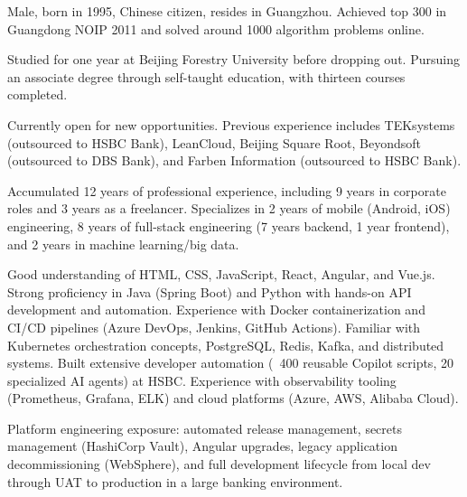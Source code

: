 

\begin{cventry}
    {} %
    {} %
    {} %
    {} %
    {
        \begin{cvitems}
            \item {Male, born in 1995, Chinese citizen, resides in Guangzhou. Achieved top 300 in Guangdong NOIP 2011 and solved around 1000 algorithm problems online.}
            \item {Studied for one year at Beijing Forestry University before dropping out. Pursuing an associate degree through self-taught education, with thirteen courses completed.}
            \item {Currently open for new opportunities. Previous experience includes TEKsystems (outsourced to HSBC Bank), LeanCloud, Beijing Square Root, Beyondsoft (outsourced to DBS Bank), and Farben Information (outsourced to HSBC Bank).}
            \item {Accumulated 12 years of professional experience, including 9 years in corporate roles and 3 years as a freelancer. Specializes in 2 years of mobile (Android, iOS) engineering, 8 years of full-stack engineering (7 years backend, 1 year frontend), and 2 years in machine learning/big data.}
            \item {Good understanding of HTML, CSS, JavaScript, React, Angular, and Vue.js. Strong proficiency in Java (Spring Boot) and Python with hands-on API development and automation. Experience with Docker containerization and CI/CD pipelines (Azure DevOps, Jenkins, GitHub Actions). Familiar with Kubernetes orchestration concepts, PostgreSQL, Redis, Kafka, and distributed systems. Built extensive developer automation (~400 reusable Copilot scripts, 20 specialized AI agents) at HSBC. Experience with observability tooling (Prometheus, Grafana, ELK) and cloud platforms (Azure, AWS, Alibaba Cloud).}
            \item {Platform engineering exposure: automated release management, secrets management (HashiCorp Vault), Angular upgrades, legacy application decommissioning (WebSphere), and full development lifecycle from local dev through UAT to production in a large banking environment.}

\end{cvitems}}
\end{cventry}
